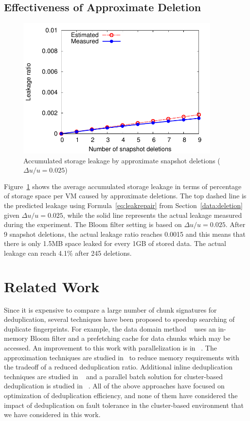  \subsection{Effectiveness of Approximate Deletion}

 \begin{figure}
     \centering
     \includegraphics[width=4in]{figures/leakage}
     \caption{Accumulated storage leakage by approximate snapshot deletions ($\Delta u/u=0.025$)}
     \label{fig:leakage}
 \end{figure}

Figure~\ref{fig:leakage} shows the average accumulated storage leakage in terms of percentage of
storage space per VM caused  by approximate deletions.
The top dashed line is the predicted leakage using Formula~\ref{eq:leakrepair} from Section~\ref{data:deletion}
given $\Delta u/u=0.025$,
while the solid line represents the actual leakage measured during the experiment. 
The Bloom filter setting is based on $\Delta u/u=0.025$.
After 9 snapshot deletions, the actual leakage ratio reaches 0.0015 and this means that
there is only 1.5MB space leaked for every 1GB of stored data.
The actual leakage can reach  4.1\% after  245 deletions.


\section{Related Work}
\label{data:related}
Since it is expensive to compare a large number of chunk signatures for deduplication,
several techniques have been proposed to speedup searching of duplicate
fingerprints. For example, the data domain method ~\cite{bottleneck08} 
uses  an in-memory Bloom filter and a prefetching cache for data chunks  which may be
accessed.  An improvement to this work with parallelization is in ~\cite{MAD210,DEBAR}.
The approximation techniques are studied in~\cite{extreme_binning09,Guo2011,WeiZhangIEEE}  
to reduce memory requirements with the tradeoff of a reduced deduplication ratio.
Additional inline deduplication techniques are studied in ~\cite{sparseindex09,Guo2011,Srinivasan2012}
and a parallel batch solution for cluster-based deduplication is 
studied in ~\cite{wei2013}. 
All of the above approaches have focused on optimization of deduplication
efficiency, and none of them have considered the impact
of deduplication on fault tolerance in the cluster-based environment that we have considered
in this work.

